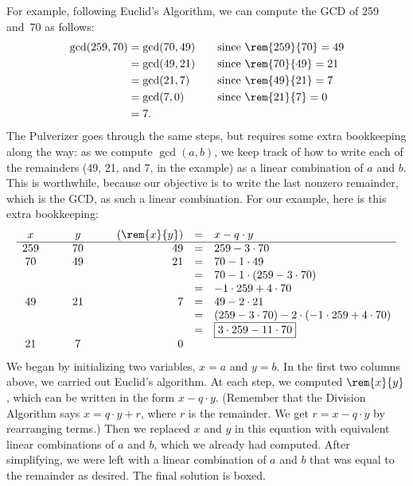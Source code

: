 For example, following Euclid's Algorithm, we can compute the GCD of
259 and~70 as follows:
\begin{align*}
\gcd(259, 70)
    & = \gcd(70, 49) & \quad & \text{since $\rem{259}{70} = 49$}\\
    & = \gcd(49, 21) && \text{since $\rem{70}{49} = 21$} \\
    & = \gcd(21, 7) && \text{since $\rem{49}{21} = 7$} \\
    & = \gcd(7, 0) && \text{since $\rem{21}{7} = 0$} \\
    & = 7.
\end{align*}
The Pulverizer goes through the same steps, but requires some extra
bookkeeping along the way: as we compute $\gcd(a, b)$, we keep track
of how to write each of the remainders (49, 21, and 7, in the example)
as a linear combination of $a$ and $b$.  This is worthwhile, because
our objective is to write the last nonzero remainder, which is the
GCD, as such a linear combination.  For our example, here is this
extra bookkeeping:
\[
\begin{array}{ccccrcl}
x & \quad & y & \quad & (\rem{x}{y}) & = & x - q \cdot y \\ \hline
259 && 70 && 49 & = &   259 - 3 \cdot 70 \\
70 && 49 && 21  & = &   70 - 1 \cdot 49 \\
&&&&            & = &   70 - 1 \cdot (259 - 3 \cdot 70) \\
&&&&            & = &   -1 \cdot 259 + 4 \cdot 70 \\
49 && 21 && 7   & = &   49 - 2 \cdot 21 \\
&&&&            & = &   (259 - 3 \cdot 70) -
                                2 \cdot (-1 \cdot 259 + 4 \cdot 70) \\
&&&&            & = &   \fbox{$3 \cdot 259 - 11 \cdot 70$} \\
21 && 7 && 0
\end{array}
\]
We began by initializing two variables, $x = a$ and $y = b$.  In the
first two columns above, we carried out Euclid's algorithm.  At each
step, we computed $\rem{x}{y}$, which can be written in the form $x - q
\cdot y$.  (Remember that the Division Algorithm says $x = q \cdot y +
r$, where $r$ is the remainder.  We get $r = x - q \cdot y$ by
rearranging terms.)  Then we replaced $x$ and $y$ in this equation
with equivalent linear combinations of $a$ and $b$, which we already
had computed.  After simplifying, we were left with a linear
combination of $a$ and $b$ that was equal to the remainder as desired.
The final solution is boxed.

